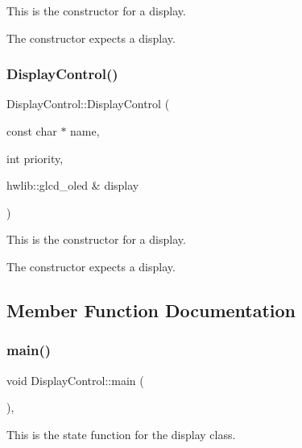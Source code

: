 This is the constructor for a display. 

The constructor expects a display. \mbox{\label{class_display_control_a5a24ccc28d6984bda6871ef6d0e4af3f}} 
\subsubsection{\texorpdfstring{Display\+Control()}{DisplayControl()}\hspace{0.1cm}{\footnotesize\ttfamily [2/2]}}
{\footnotesize\ttfamily Display\+Control\+::\+Display\+Control (\begin{DoxyParamCaption}\item[{const char $\ast$}]{name,  }\item[{int}]{priority,  }\item[{hwlib\+::glcd\+\_\+oled \&}]{display }\end{DoxyParamCaption})\hspace{0.3cm}{\ttfamily [inline]}}



This is the constructor for a display. 

The constructor expects a display. 

\subsection{Member Function Documentation}
\mbox{\label{class_display_control_a9707c32249e0a648afc2def818900f30}} 
\subsubsection{\texorpdfstring{main()}{main()}\hspace{0.1cm}{\footnotesize\ttfamily [1/2]}}
{\footnotesize\ttfamily void Display\+Control\+::main (\begin{DoxyParamCaption}{ }\end{DoxyParamCaption})\hspace{0.3cm}{\ttfamily [inline]}, {\ttfamily [override]}}



This is the state function for the display class. 

